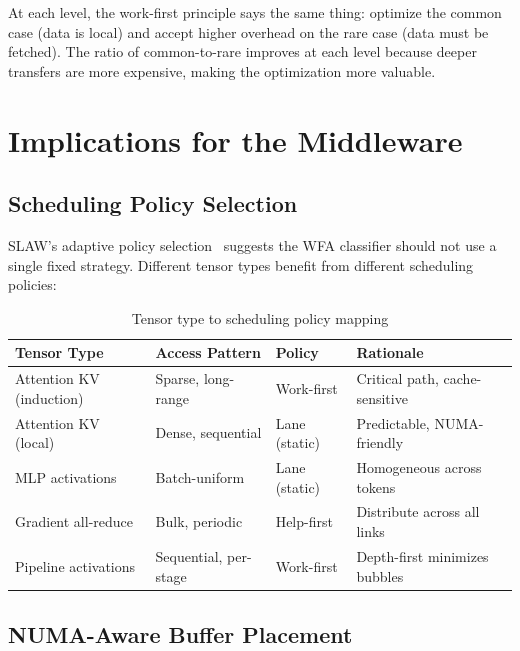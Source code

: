 \documentclass[11pt,letterpaper]{article}
\begin{document}
At each level, the work-first principle says the same thing: optimize the common case (data is local) and accept higher overhead on the rare case (data must be fetched). The ratio of common-to-rare improves at each level because deeper transfers are more expensive, making the optimization more valuable.

\section{Implications for the Middleware}
\label{sec:implications}

\subsection{Scheduling Policy Selection}

SLAW's adaptive policy selection~\cite{guo2010slaw} suggests the WFA classifier should not use a single fixed strategy. Different tensor types benefit from different scheduling policies:

\begin{table}[htbp]
\centering
\caption{Tensor type to scheduling policy mapping}
\label{tab:policy}
\begin{tabular}{@{}llll@{}}
\toprule
\textbf{Tensor Type} & \textbf{Access Pattern} & \textbf{Policy} & \textbf{Rationale} \\
\midrule
Attention KV (induction) & Sparse, long-range & Work-first & Critical path, cache-sensitive \\
Attention KV (local) & Dense, sequential & Lane (static) & Predictable, NUMA-friendly \\
MLP activations & Batch-uniform & Lane (static) & Homogeneous across tokens \\
Gradient all-reduce & Bulk, periodic & Help-first & Distribute across all links \\
Pipeline activations & Sequential, per-stage & Work-first & Depth-first minimizes bubbles \\
\bottomrule
\end{tabular}
\end{table}

\subsection{NUMA-Aware Buffer Placement}
\end{document}
